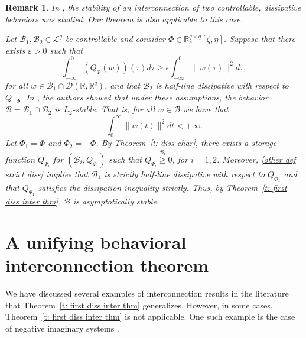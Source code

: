 \documentclass[letterpaper, 10 pt, conference]{ieeeconf}
\theoremstyle{ieeeconf}
\newtheorem{remark}{Remark}
\newcommand{\R}{\mathbb{R}}
\newcommand{\B}{\mathcal{B}}
\begin{document}
\begin{remark}
	\label{r: another behavioral}
	In \cite{takaba_stability_2005}, the stability of an interconnection of two controllable, dissipative behaviors was studied. Our theorem is also applicable to this case.
	
	Let $\B_1,\B_2 \in \mathcal{L}^q$ be controllable and consider ${\Phi \in \R_s^{q \times q}[\zeta,\eta]}$. Suppose that there exists $\varepsilon>0$ such that
	\begin{equation}
		\int_{-\infty}^0 \left(Q_{\Phi}(w)\right)(\tau) d\tau\geq \epsilon \int_{-\infty}^0 \|w(\tau)\|^2 d\tau,
		\label{other def strict diss}
	\end{equation}
	for all $w \in \B_1 \cap \mathcal{D}(\R, \R^q)$, and that $\B_2$ is half-line dissipative with respect to $Q_{-\Phi}$. In \cite[Theorem~1]{takaba_stability_2005}, the authors showed that under these assumptions, the behavior $\B=\B_1 \cap \B_2$ is \linebreak$L_2$-stable. That is, for all $w\in \B$ we have that
	\begin{equation*}
		\int_0^\infty \|w(t)\|^2 dt <+\infty.
	\end{equation*}
	Let $\Phi_1=\Phi$ and $\Phi_2=-\Phi$. By Theorem~\ref{t: diss char}, there exists a storage function $Q_{\Psi_i}$ for $(\B_i,Q_{\Phi_i})$ such that ${Q_{\Psi_i}\stackrel{\B_i}{\geq}0}$, for $i=1,2$. Moreover, \eqref{other def strict diss} implies that $\B_1$ is strictly half-line dissipative with respect to $Q_{\Phi_1}$ and that $Q_{\Psi_1}$ satisfies the dissipation inequality strictly.
	Thus, by Theorem~\ref{t: first diss inter thm}, $\B$ is asymptotically stable.
\end{remark}

\section{A unifying behavioral interconnection theorem}
\label{sec:main theorem}
We have discussed several examples of interconnection results in the literature that Theorem~\ref{t: first diss inter thm} generalizes. However, in some cases, Theorem~\ref{t: first diss inter thm} is not applicable. One such example is the case of negative imaginary systems \cite{xiong_negative_2010}.
\end{document}

